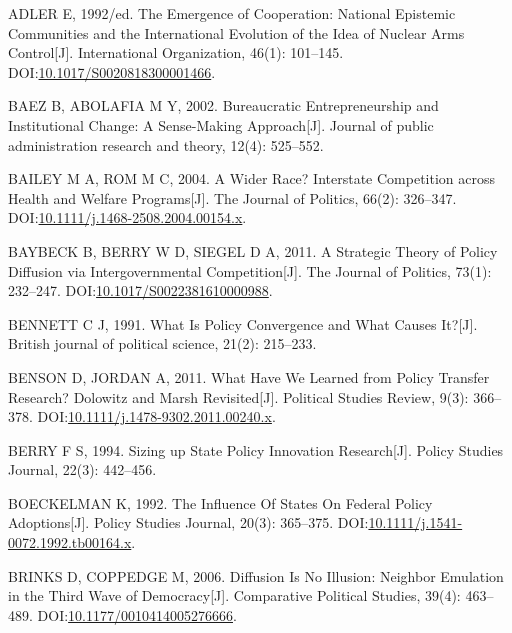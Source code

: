 \documentclass[
  12pt,
]{ctexart}
\newlength{\cslhangindent}
\newlength{\cslentryspacingunit} %
\newenvironment{CSLReferences}[2] %
 {%
  \setlength{\parindent}{0pt}
  \ifodd #1
  \let\oldpar\par
  \def\par{\hangindent=\cslhangindent\oldpar}
  \fi
  \setlength{\parskip}{#2\cslentryspacingunit}
 }%
 {}
\begin{document}
\hypertarget{refs}{}
\begin{CSLReferences}{1}{0}
\leavevmode{}%
ADLER E, 1992/ed. The Emergence of Cooperation: National Epistemic Communities and the International Evolution of the Idea of Nuclear Arms Control{[}J{]}. International Organization, 46(1): 101--145. DOI:\href{https://doi.org/10.1017/S0020818300001466}{10.1017/S0020818300001466}.

\leavevmode{}%
BAEZ B, ABOLAFIA M Y, 2002. Bureaucratic Entrepreneurship and Institutional Change: A Sense-Making Approach{[}J{]}. Journal of public administration research and theory, 12(4): 525--552.

\leavevmode{}%
BAILEY M A, ROM M C, 2004. A {Wider Race}? {Interstate Competition} across {Health} and {Welfare Programs}{[}J{]}. The Journal of Politics, 66(2): 326--347. DOI:\href{https://doi.org/10.1111/j.1468-2508.2004.00154.x}{10.1111/j.1468-2508.2004.00154.x}.

\leavevmode{}%
BAYBECK B, BERRY W D, SIEGEL D A, 2011. A {Strategic Theory} of {Policy Diffusion} via {Intergovernmental Competition}{[}J{]}. The Journal of Politics, 73(1): 232--247. DOI:\href{https://doi.org/10.1017/S0022381610000988}{10.1017/S0022381610000988}.

\leavevmode{}%
BENNETT C J, 1991. What Is Policy Convergence and What Causes It?{[}J{]}. British journal of political science, 21(2): 215--233.

\leavevmode{}%
BENSON D, JORDAN A, 2011. What Have We {Learned} from {Policy Transfer Research}? {Dolowitz} and {Marsh Revisited}{[}J{]}. Political Studies Review, 9(3): 366--378. DOI:\href{https://doi.org/10.1111/j.1478-9302.2011.00240.x}{10.1111/j.1478-9302.2011.00240.x}.

\leavevmode{}%
BERRY F S, 1994. Sizing up {State Policy Innovation Research}{[}J{]}. Policy Studies Journal, 22(3): 442--456.

\leavevmode{}%
BOECKELMAN K, 1992. The {Influence Of States On Federal Policy Adoptions}{[}J{]}. Policy Studies Journal, 20(3): 365--375. DOI:\href{https://doi.org/10.1111/j.1541-0072.1992.tb00164.x}{10.1111/j.1541-0072.1992.tb00164.x}.

\leavevmode{}%
BRINKS D, COPPEDGE M, 2006. Diffusion {Is No Illusion}: {Neighbor Emulation} in the {Third Wave} of {Democracy}{[}J{]}. Comparative Political Studies, 39(4): 463--489. DOI:\href{https://doi.org/10.1177/0010414005276666}{10.1177/0010414005276666}.


\end{CSLReferences}
\end{document}
